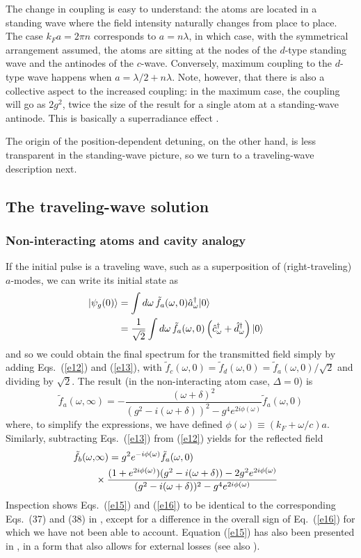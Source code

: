 \documentclass[aps,pra,twocolumn,floatfix,superscriptaddress]{revtex4}
\begin{document}
The change in coupling is easy to understand:  the atoms are located in a standing wave where the field intensity naturally changes from place to place.  The case $k_F a = 2\pi n$ corresponds to $a=n\lambda$, in which case, with the symmetrical arrangement assumed, the atoms are sitting at the nodes of the $d$-type standing wave and the antinodes of the $c$-wave.  Conversely, maximum coupling to the $d$-type wave happens when $a = \lambda/2 + n\lambda$.  Note, however, that there is also a collective aspect to the increased coupling: in the maximum case, the coupling will go as $2g^2$, twice the size of the result for a single atom at a standing-wave antinode. This is basically a   superradiance effect \cite{Dicke, Haroche}.

The origin of the position-dependent detuning, on the other hand, is less transparent in the standing-wave picture, so we turn to a traveling-wave description next.


\subsection{The traveling-wave solution}

\subsubsection{Non-interacting atoms and cavity analogy}
If the initial pulse is a traveling wave, such as a superposition of (right-traveling) $a$-modes, we can write its initial state as
\begin{align}
|\psi_g(0)\rangle &= \int d\omega\, \tilde f_a(\omega,0) \hat a^\dagger_\omega |0\rangle \cr
&= \frac{1}{\sqrt 2}\int d\omega\, \tilde f_a(\omega,0) \left(\hat c^\dagger_\omega + \hat d^\dagger_\omega\right)|0\rangle
\label{e14}
\end{align}
and so we could obtain the final spectrum for the transmitted field simply by adding Eqs.~(\ref{e12}) and (\ref{e13}), with $\tilde f_c(\omega,0) = \tilde f_d(\omega,0) = \tilde f_a(\omega,0)/\sqrt 2$ and dividing by $\sqrt 2$.  The result (in the non-interacting atom case, $\Delta =0$) is
\begin{equation}
\tilde f_a(\omega,\infty) = -\frac{(\omega+\delta)^2}{(g^2-i(\omega+\delta))^2-g^4e^{2i\phi(\omega)}}\tilde f_a(\omega,0)
\label{e15}
\end{equation}
where, to simplify the expressions, we have defined $\phi(\omega) \equiv (k_F+\omega/c)a$. Similarly, subtracting Eqs.~(\ref{e13}) from (\ref{e12}) yields for the reflected field
\begin{align}
\tilde f_b(\omega,&\infty) = g^2 e^{-i\phi(\omega)} \tilde f_a(\omega,0) \cr
&\times \frac{(1+e^{2 i\phi(\omega)})(g^2-i(\omega+\delta))-2g^2 e^{2i\phi(\omega)}}{(g^2-i(\omega+\delta))^2-g^4e^{2i\phi(\omega)}}
\label{e16}
\end{align}
Inspection shows Eqs.~(\ref{e15}) and (\ref{e16}) to be identical to the corresponding Eqs.~(37) and (38) in \cite{zubairy1}, except for a difference in the overall sign of Eq.~(\ref{e16}) for which we have not been able to account. Equation (\ref{e15}) has also been presented in \cite{zheng2}, in a form that also allows for external losses (see also \cite{garciavidal1}).
\end{document}
